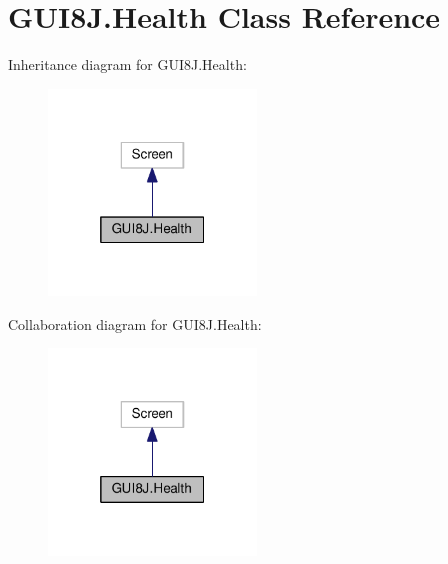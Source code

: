 \hypertarget{classGUI8J_1_1Health}{}\section{G\+U\+I8\+J.\+Health Class Reference}
\label{classGUI8J_1_1Health}


Inheritance diagram for G\+U\+I8\+J.\+Health\+:\nopagebreak
\begin{figure}[H]
\begin{center}
\leavevmode
\includegraphics[width=157pt]{classGUI8J_1_1Health__inherit__graph}
\end{center}
\end{figure}


Collaboration diagram for G\+U\+I8\+J.\+Health\+:\nopagebreak
\begin{figure}[H]
\begin{center}
\leavevmode
\includegraphics[width=157pt]{classGUI8J_1_1Health__coll__graph}
\end{center}
\end{figure}
